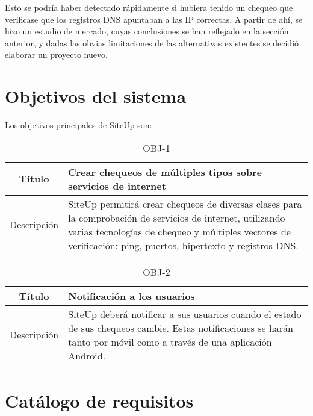 Esto se podría haber detectado rápidamente si hubiera tenido un chequeo que
verificase que los registros DNS apuntaban a las IP correctas. A partir de ahí,
se hizo un estudio de mercado, cuyas conclusiones se han reflejado en la sección
anterior, y dadas las obvias limitaciones de las alternativas existentes se
decidió elaborar un proyecto nuevo.

\section{Objetivos del sistema}

Los objetivos principales de SiteUp son:

\begin{table}[h!]
  \centering
  \begin{tabularx}{\textwidth}{|c|X|}
    \hline
    Título & Crear chequeos de múltiples tipos sobre servicios de internet \\

    \hline

    Descripción & SiteUp permitirá crear chequeos de diversas clases para la
    comprobación de servicios de internet, utilizando varias tecnologías de
    chequeo y múltiples vectores de verificación: ping, puertos, hipertexto y
    registros DNS. \\    

    \hline
  \end{tabularx}
  \caption{OBJ-1}
\end{table}


\begin{table}[h!]
  \centering
  \begin{tabularx}{\textwidth}{|c|X|}
    \hline
    Título & Notificación a los usuarios \\

    \hline

    Descripción & SiteUp deberá notificar a sus usuarios cuando el estado de sus
    chequeos cambie. Estas notificaciones se harán tanto por móvil como a través
    de una aplicación Android. \\

    \hline
  \end{tabularx}
  \caption{OBJ-2}
\end{table}

\section{Catálogo de requisitos}


